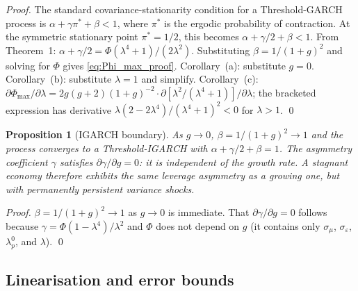 \documentclass[12pt,a4paper]{article}
\newtheorem{proposition}[theorem]{Proposition}
\theoremstyle{definition}
\begin{document}
\begin{proof}
The standard covariance-stationarity condition for a Threshold-GARCH
process is $\alpha + \gamma\pi^* + \beta < 1$, where $\pi^*$ is the
ergodic probability of contraction. At the symmetric stationary point
$\pi^* = 1/2$, this becomes $\alpha + \gamma/2 + \beta < 1$. From
Theorem~1: $\alpha + \gamma/2 = \Phi(\lambda^4+1)/(2\lambda^2)$.
Substituting $\beta = 1/(1+g)^2$ and solving for $\Phi$ gives
\eqref{eq:Phi_max_proof}. Corollary~(a): substitute $g=0$.
Corollary~(b): substitute $\lambda=1$ and simplify. Corollary~(c):
$\partial\Phi_{\max}/\partial\lambda = 2g(g+2)(1+g)^{-2}
\cdot\partial[\lambda^2/(\lambda^4+1)]/\partial\lambda$;
the bracketed expression has derivative
$\lambda(2-2\lambda^4)/(\lambda^4+1)^2 < 0$ for $\lambda > 1$.
\qed
\end{proof}

\begin{proposition}[IGARCH boundary]
\label{prop:igarch}
As $g \to 0$, $\beta = 1/(1+g)^2 \to 1$ and the process converges
to a Threshold-IGARCH with $\alpha + \gamma/2 + \beta = 1$. The
asymmetry coefficient $\gamma$ satisfies $\partial\gamma/\partial g
= 0$: it is independent of the growth rate. A stagnant economy
therefore exhibits the same leverage asymmetry as a growing one,
but with permanently persistent variance shocks.
\end{proposition}

\begin{proof}
$\beta = 1/(1+g)^2 \to 1$ as $g \to 0$ is immediate. That
$\partial\gamma/\partial g = 0$ follows because $\gamma =
\Phi(1-\lambda^4)/\lambda^2$ and $\Phi$ does not depend on $g$
(it contains only $\sigma_\mu$, $\sigma_\varepsilon$, $\lambda^0_p$,
and $\lambda$).
\qed
\end{proof}

\subsection{Linearisation and error bounds}
\end{document}
